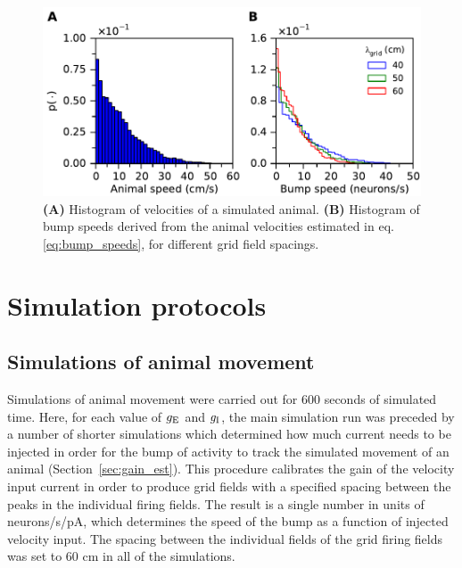 \documentclass[a4paper,12pt]{article}
\newcommand{\ssc}[3]{\ensuremath{#1_{\text{#2}_{\text{#3}}}}}
\newcommand{\gE      }{\ssc{g}      {\scriptsize{E}}{}}
\newcommand{\gI      }{\ssc{g}      {\scriptsize{I}}{}}
\begin{document}
\renewcommand{\figurename}{Supplementary Methods Figure}
\begin{figure}[th]
    \begin{center}
        \includegraphics[trim=0 0.6cm 0 0 ]{velocity_histograms.pdf}
    \end{center}
    \internallinenumbers
    \caption{\textbf{(A)} Histogram of velocities of a simulated animal.
    \textbf{(B)} Histogram of bump speeds derived from the animal velocities
    estimated in eq. \eqref{eq:bump_speeds}, for different grid field spacings.}
    \label{fig:velocity_histograms}
\end{figure}


\section{Simulation protocols} \label{sec:noise_protocols}

\subsection{Simulations of animal movement} \label{sec:noise_grids_protocol}

Simulations of animal movement were carried out for 600 seconds of simulated
time.  Here, for each value of $\gE$ and $\gI$, the main simulation run was
preceded by a number of shorter simulations which determined how much current
needs to be injected in order for the bump of activity to track the simulated
movement of an animal (Section~\ref{sec:gain_est}). This procedure calibrates
the gain of the velocity input current in order to produce grid fields with a
specified spacing between the peaks in the individual firing fields. The result
is a single number in units of neurons/s/pA, which determines the speed of the
bump as a function of injected velocity input. The spacing between the
individual fields of the grid firing fields was set to 60 cm in all of the
simulations.
\end{document}
